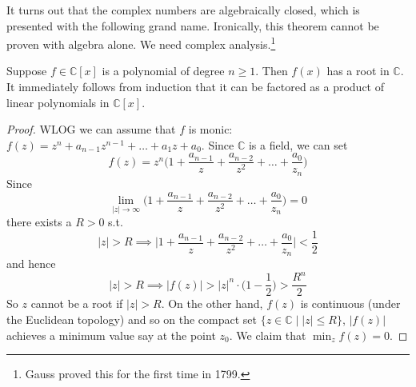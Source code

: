   It turns out that the complex numbers are algebraically closed, which is presented with the following grand name. Ironically, this theorem cannot be proven with algebra alone. We need complex analysis.\footnote{Gauss proved this for the first time in 1799.} 

  \begin{theorem}
    Suppose $f \in \mathbb{C}[x]$ is a polynomial of degree $n \geq 1$. Then $f(x)$ has a root in $\mathbb{C}$. It immediately follows from induction that it can be factored as a product of linear polynomials in $\mathbb{C}[x]$. 
  \end{theorem}
  \begin{proof}
    WLOG we can assume that $f$ is monic: $f(z) = z^n + a_{n-1} z^{n-1} + \ldots + a_1 z + a_0$. Since $\mathbb{C}$ is a field, we can set 
    \begin{equation}
      f(z) = z^n \bigg( 1 + \frac{a_{n-1}}{z} + \frac{a_{n-2}}{z^2} + \ldots + \frac{a_0}{z_n} \bigg)
    \end{equation} 
    Since 
    \begin{equation}
      \lim_{|z| \rightarrow \infty} \bigg( 1 + \frac{a_{n-1}}{z} + \frac{a_{n-2}}{z^2} + \ldots + \frac{a_0}{z_n} \bigg) = 0
    \end{equation}
    there exists a $R > 0$ s.t. 
    \begin{equation}
      |z| > R \implies \bigg| 1 + \frac{a_{n-1}}{z} + \frac{a_{n-2}}{z^2} + \ldots + \frac{a_0}{z_n} \bigg| < \frac{1}{2}
    \end{equation}
    and hence 
    \begin{equation}
      |z| > R \implies |f(z)| > |z|^n \cdot \bigg( 1 - \frac{1}{2} \bigg) > \frac{R^n}{2}
    \end{equation}
    So $z$ cannot be a root if $|z| > R$. On the other hand, $f(z)$ is continuous (under the Euclidean topology) and so on the compact set $\{z \in \mathbb{C} \mid |z| \leq R\}$, $|f(z)|$ achieves a minimum value say at the point $z_0$. We claim that $\min_z f(z) = 0$. 


\end{proof}
